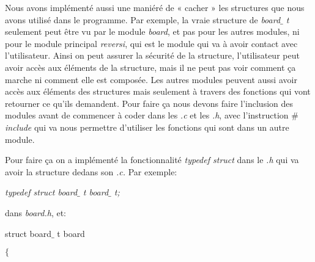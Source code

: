\documentclass[a4paper,12pt]{article}
\begin{document}
\begin{justify}
Nous avons implémenté aussi une maniéré de « cacher » les structures que nous avons utilisé dans le programme. Par exemple, la vraie structure de \textit{board$ \_ $ t }seulement peut être vu par le module \textit{board}, et pas pour les autres modules, ni pour le module principal \textit{reversi}, qui est le module qui va à avoir contact avec l’utilisateur. Ainsi on peut assurer la sécurité de la structure, l’utilisateur peut avoir accès aux éléments de la structure, mais il ne peut pas voir comment ça marche ni comment elle est composée. Les autres modules peuvent aussi avoir accès aux éléments des structures mais seulement à travers des fonctions qui vont retourner ce qu’ils demandent. Pour faire ça nous devons faire l’inclusion des modules avant de commencer à coder dans les \textit{.c} et les \textit{.h}, avec l’instruction \textit{$\#$ include }qui va nous permettre d’utiliser les fonctions qui sont dans un autre module.
\end{justify}\par

\begin{justify}
Pour faire ça on a implémenté la fonctionnalité \textit{typedef struct }dans le \textit{.h} qui va avoir la structure dedans son \textit{.c. }Par exemple:
\end{justify}\par

\begin{Center}
\textit{typedef struct board$ \_ $ t board$ \_ $ t; } 
\end{Center}\par


\begin{justify}
dans \textit{board.h}, et:
\end{justify}\par

\begin{justify}
\hspace*{0.49in}\hspace*{0.49in}\hspace*{0.49in}\hspace*{0.49in}\hspace*{0.49in}struct board$ \_ $ t board
\end{justify}\par

\begin{justify}
\hspace*{0.49in}\hspace*{0.49in}\hspace*{0.49in}\hspace*{0.49in}\hspace*{0.49in}$ \{ $ 
\end{justify}\par
\end{document}
